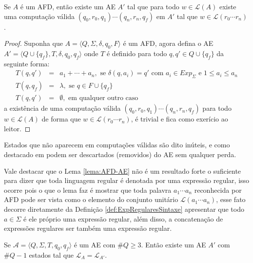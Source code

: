 \begin{lema}\label{lema:AFD-AE}
	Se $A$ é um AFD, então existe um AE $A'$ tal que para todo $w \in \mathcal{L}(A)$ existe uma computação válida $(q_0, r_0, q_1)\cdots (q_n, r_n, q_f)$ em $A'$ tal que $w \in \mathcal{L}(r_0\cdots r_n)$.
\end{lema}

\begin{proof}
	Suponha que $A = \langle Q, \Sigma, \delta, q_0, F \rangle$ é um AFD, agora defina o AE $A' = \langle Q \cup \{q_f\}, T, \delta, q_0, q_f \rangle$ onde $T$ é definido para todo $q, q' \in Q \cup \{q_f\}$ da seguinte forma:
	\begin{eqnarray*}
		T(q, q') & = & a_1 + \cdots + a_n, \mbox{ se } \delta(q, a_i) = q' \mbox{ com } a_i \in Exp_\Sigma \mbox{ e }1 \leq a_i \leq a_n\\
		T(q, q_f) & = & \lambda, \mbox{ se } q \in F \cup \{q_f\}\\
		T(q, q') & = & \emptyset, \mbox{ em qualquer outro caso }
	\end{eqnarray*}
	a existência de uma computação válida $(q_0, r_0, q_1)\cdots (q_n, r_n, q_f)$ para todo $w \in \mathcal{L}(A)$ de forma que $w \in \mathcal{L}(r_0\cdots r_n)$, é trivial e fica como exerício ao leitor.
\end{proof}

\begin{nota}
	Estados que não aparecem em computações válidas são dito inúteis, e como destacado em \cite{erickson2014} podem ser descartados (removidos) do AE sem qualquer perda.
\end{nota}

Vale destacar que o Lema \ref{lema:AFD-AE} não é um resultado forte o suficiente para dizer que toda linguagem regular é denotada por uma expressão regular, isso ocorre pois o que o lema faz é mostrar que toda palavra $a_1\cdots a_n$ reconhecida por AFD pode ser vista como o elemento do conjunto unitário $\mathcal{L}(a_1\cdots a_n)$, esse fato decorre diretamente da Definição \ref{def:ExpRegularesSintaxe} apresentar que todo $a \in \Sigma$ é ele próprio uma expressão regular, além disso, a concatenação de expressões regulares ser também uma expressão regular.

\begin{teorema}\label{teo:ReducaoAutomato}
	Se $\mathcal{A} = \langle Q, \Sigma, T, q_0, q_f \rangle$ é um AE com $\#Q \geq 3$. Então existe um AE $A'$ com $\#Q - 1$ estados tal que $\mathcal{L}_A = \mathcal{L}_{A'}$.
\end{teorema}

